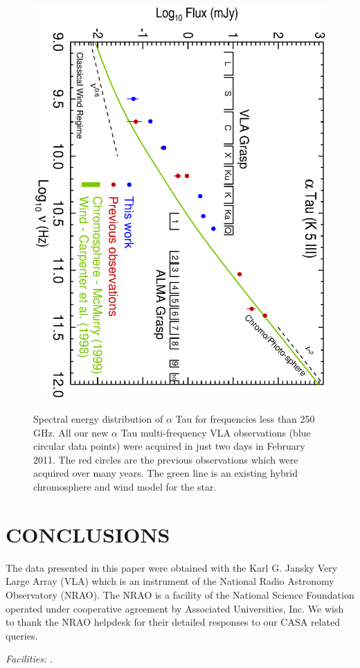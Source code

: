 \documentclass[iop]{emulateapj}
\begin{document}
\begin{figure}
\includegraphics[trim = 0mm 0mm 0mm 20mm, clip,scale=0.65, angle=90]{fig2.ps}
\\
\caption{Spectral energy distribution of $\alpha$ Tau for frequencies less than 250 GHz. All our new $\alpha$ Tau multi-frequency VLA observations (blue circular data points) were acquired in just two days in February 2011. The red circles are the previous observations which were acquired over many years. The green line is an existing hybrid chromosphere and wind model for the star.}
\label{fig:fig2}
\end{figure}

\section{CONCLUSIONS}

\acknowledgments
The data presented in this paper were obtained with the Karl G. Jansky Very Large Array (VLA) which is an instrument of the National Radio Astronomy Observatory (NRAO). The NRAO is a facility of the National Science Foundation operated under cooperative agreement by Associated Universities, Inc. We wish to thank the NRAO helpdesk for their detailed responses to our CASA related queries.

{\it Facilities:} .


\end{document}
